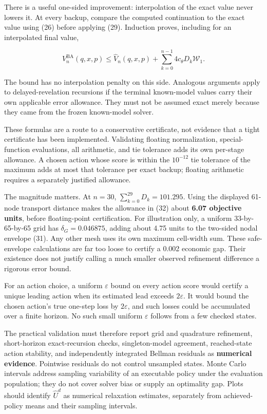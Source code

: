 \documentclass[10pt,a4paper]{article}
\begin{document}
There is a useful one-sided improvement: interpolation of the exact value
never lowers it. At every backup, compare the computed continuation to the
exact value using (26) before applying (29). Induction proves, including for
an interpolated final value,

\begin{equation}
V_n^{\mathrm{BA}}(q,x,p)
\le\widehat V_n(q,x,p)+
\sum_{k=0}^{n-1}4c_\theta D_k\mathcal W_1.
\tag{32}
\end{equation}

The bound has no interpolation penalty on this side. Analogous arguments
apply to delayed-revelation recursions if the terminal known-model values
carry their own applicable error allowance. They must not be assumed exact
merely because they came from the frozen known-model solver.

These formulas are a route to a conservative certificate, not evidence that a
tight certificate has been implemented. Validating floating normalization,
special-function evaluations, all arithmetic, and tie tolerance adds its own
per-stage allowance. A chosen action whose score is within the $10^{-12}$
tie tolerance of the maximum adds at most that tolerance per exact backup;
floating arithmetic requires a separately justified allowance.

The magnitude matters. At $n=30$, $\sum_{k=0}^{29}D_k=101.295$.
Using the displayed 61-node transport distance makes the allowance in (32)
about \textbf{6.07 objective units}, before floating-point certification. For illustration only, a uniform 33-by-65-by-65 grid has $\delta_G=0.046875$, adding about 4.75 units to the two-sided nodal envelope (31). Any other mesh uses its own maximum cell-width sum. These safe-envelope calculations are far too
loose to certify a 0.002 economic gap. Their existence does not justify
calling a much smaller observed refinement difference a rigorous error bound.

For an action choice, a uniform $\varepsilon$ bound on every action score
would certify a unique leading action when its estimated lead exceeds
$2\varepsilon$. It would bound the chosen action's true one-step loss by
$2\varepsilon$, and such losses could be accumulated over a finite horizon.
No such small uniform $\varepsilon$ follows from a few checked states.

The practical validation must therefore report grid and quadrature refinement,
short-horizon exact-recursion checks, singleton-model agreement, reached-state
action stability, and independently integrated Bellman residuals as \textbf{numerical
evidence}. Pointwise residuals do not control unsampled states. Monte Carlo
intervals address sampling variability of an executable policy under the
evaluation population; they do not cover solver bias or supply an optimality
gap. Plots should identify $\widehat U^d$ as numerical relaxation estimates,
separately from achieved-policy means and their sampling intervals.
\end{document}
